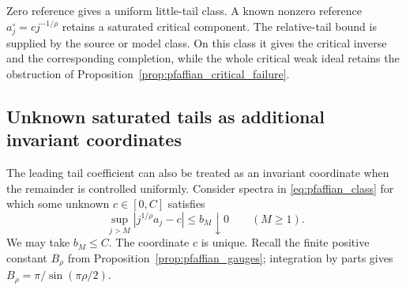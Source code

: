 \documentclass[11pt,a4paper]{amsart}
\numberwithin{equation}{section}
\theoremstyle{definition}
\theoremstyle{remark}
\begin{document}
Zero reference gives a uniform little-tail class. A known nonzero reference $a_j^\circ=cj^{-1/\rho}$ retains a saturated critical component. The relative-tail bound is supplied by the source or model class. On this class it gives the critical inverse and the corresponding completion, while the whole critical weak ideal retains the obstruction of Proposition~\ref{prop:pfaffian_critical_failure}.

\subsection{Unknown saturated tails as additional invariant coordinates}
The leading tail coefficient can also be treated as an invariant coordinate when the remainder is controlled uniformly. Consider spectra in \eqref{eq:pfaffian_class} for which some unknown $c\in[0,C]$ satisfies
\begin{equation}\label{eq:pfaffian_asymptotic_class}
 \sup_{j>M}|j^{1/\rho}a_j-c|\le b_M\downarrow0\qquad(M\ge1).
\end{equation}
We may take $b_M\le C$. The coordinate $c$ is unique. Recall the finite positive constant $B_\rho$ from Proposition~\ref{prop:pfaffian_gauges}; integration by parts gives
$B_\rho=\pi/\sin(\pi\rho/2)$.
\end{document}
